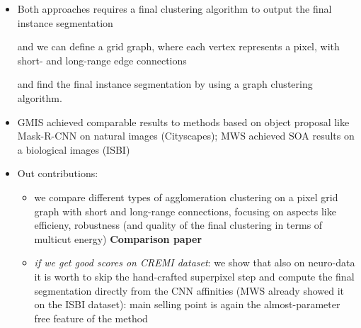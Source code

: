 \begin{itemize}
\begin{itemize}
\item Both approaches requires a final clustering algorithm to output the final instance segmentation 

 and we can define a grid graph, where each vertex represents a pixel, with short- and long-range edge connections 

 and find the final instance segmentation by using a graph clustering algorithm.

\item GMIS achieved 
comparable results to methods based on object 
proposal like Mask-R-CNN on natural images 
(Cityscapes); MWS achieved SOA results on a 
biological images (ISBI)

\item Out contributions:

\begin{itemize}
 \item we compare different types of agglomeration clustering on a pixel grid graph with short and long-range connections, focusing on aspects like efficieny, robustness (and quality of the final clustering in terms of multicut energy) \textbf{Comparison paper}
 \item \textit{if we get good scores on CREMI dataset}: we show that also on neuro-data it is worth to skip the hand-crafted superpixel step and compute the final segmentation directly from the CNN affinities (MWS already showed it on the ISBI dataset): main selling point is again the almost-parameter free feature of the method
\end{itemize}
\end{itemize}
\end{itemize}


